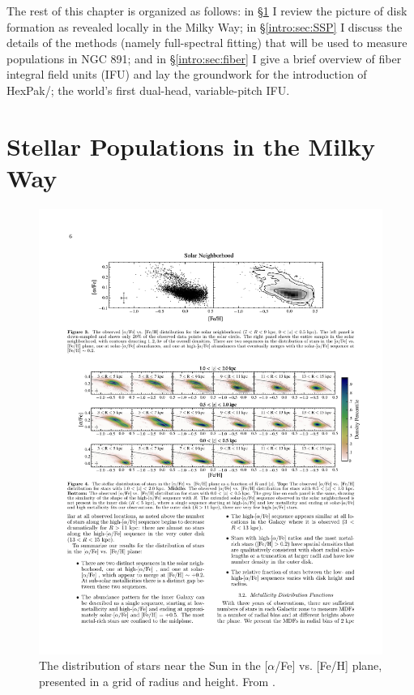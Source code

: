 The rest of this chapter is organized as follows: in
\S\ref{intro:sec:MW} I review the picture of disk formation as
revealed locally in the Milky Way; in \S\ref{intro:sec:SSP} I discuss
the details of the methods (namely full-spectral fitting) that will be
used to measure populations in NGC 891; and in \S\ref{intro:sec:fiber}
I give a brief overview of fiber integral field units (IFU) and lay
the groundwork for the introduction of HexPak/\GP; the world's first
dual-head, variable-pitch IFU.

\section{Stellar Populations in the Milky Way}
\label{intro:sec:MW}
\begin{figure}
  \centering
  \includegraphics[width=\textwidth]{Introduction/figs/hayden_15.pdf}
  \caption[Distribution of stars in the solar
    cylinder]{\fixspacing\label{intro:fig:hayden}The distribution of
    stars near the Sun in the [$\alpha$/Fe] vs. [Fe/H] plane,
    presented in a grid of radius and height. From \citet{Hayden15}.}
\end{figure}

